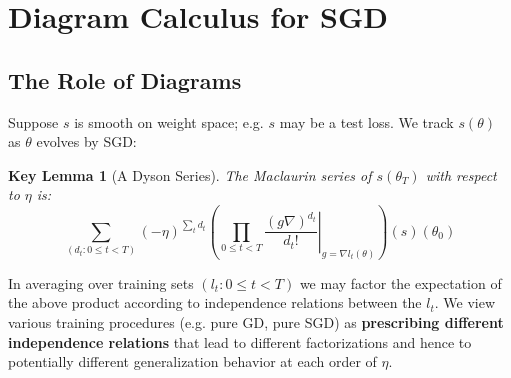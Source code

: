 \documentclass{article}
\newtheorem{klem}{Key Lemma}
\begin{document}

\section{Diagram Calculus for SGD}


    \subsection{The Role of Diagrams}
        Suppose $s$ is smooth on weight space; e.g. $s$ may be a test loss.  We
        track $s(\theta)$ as $\theta$ evolves by SGD:
        \begin{klem}[A Dyson Series]
            The Maclaurin series of $s(\theta_T)$ with respect to $\eta$ is:
            \begin{equation}\label{eq:dyson}
                \sum_{(d_t: 0\leq t<T)}
                (-\eta)^{\sum_t d_t}
                \left(
                    \prod_{0 \leq t < T}
                        \left.  \frac{(g \nabla)^{d_t}}{d_t!} \right|_{g=\nabla l_t(\theta)}
                \right)
                (s) (\theta_0)
            \end{equation}
        \end{klem}
        In averaging over training sets $(l_t: 0\leq t<T)$ we may factor the
        expectation of the above product according to independence relations
        between the $l_t$.  We view various training procedures (e.g. pure GD,
        pure SGD) as {\bf prescribing different independence relations} that
        lead to different factorizations and hence to potentially different
        generalization behavior at each order of $\eta$.
    
\end{document}
